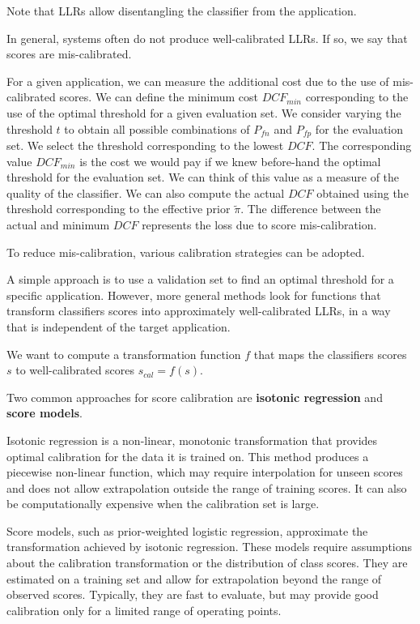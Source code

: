 Note that LLRs allow disentangling the classifier from the application.

In general, systems often do not produce well-calibrated LLRs. If so, we say that scores are mis-calibrated.

For a given application, we can measure the additional cost due to the use of mis-calibrated scores. We can define the minimum cost $DCF_{min}$ corresponding to the use of the optimal threshold for a given evaluation set. We consider varying the threshold $t$ to obtain all possible combinations of $P_{fn}$ and $P_{fp}$ for the evaluation set. We select the threshold corresponding to the lowest $DCF$. The corresponding value $DCF_{min}$ is the cost we would pay if we knew before-hand the optimal threshold for the evaluation set. We can think of this value as a measure of the quality of the classifier. We can also compute the actual $DCF$ obtained using the threshold corresponding to the effective prior $\tilde{\pi}$. The difference between the actual and minimum $DCF$ represents the loss due to score mis-calibration.

To reduce mis-calibration, various calibration strategies can be adopted.

A simple approach is to use a validation set to find an optimal threshold for a specific application. However, more general methods look for functions that transform classifiers scores into approximately well-calibrated LLRs, in a way that is independent of the target application.

We want to compute a transformation function $f$ that maps the classifiers scores $s$ to well-calibrated scores $s_{cal} = f(s)$.

Two common approaches for score calibration are \textbf{isotonic regression} and \textbf{score models}.

Isotonic regression is a non-linear, monotonic transformation that provides optimal calibration for the data it is trained on. This method produces a piecewise non-linear function, which may require interpolation for unseen scores and does not allow extrapolation outside the range of training scores. It can also be computationally expensive when the calibration set is large.

Score models, such as prior-weighted logistic regression, approximate the transformation achieved by isotonic regression. These models require assumptions about the calibration transformation or the distribution of class scores. They are estimated on a training set and allow for extrapolation beyond the range of observed scores. Typically, they are fast to evaluate, but may provide good calibration only for a limited range of operating points.
